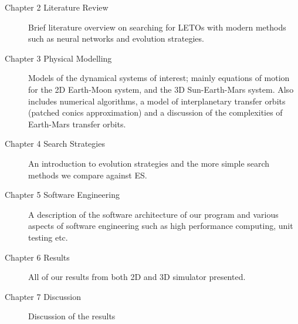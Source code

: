 \begin{description}
	\item[Chapter 2 Literature Review]{Brief literature overview on searching for LETOs with modern methods such as neural networks and evolution strategies.}
	\item[Chapter 3 Physical Modelling]{Models of the dynamical systems of interest; mainly equations of motion for the 2D Earth-Moon system, and the 3D Sun-Earth-Mars system. Also includes numerical algorithms, a model of interplanetary transfer orbits (patched conics approximation) and a discussion of the complexities of Earth-Mars transfer orbits.}
	\item[Chapter 4 Search Strategies]{An introduction to evolution strategies and the more simple search methods we compare against ES.}
	\item[Chapter 5 Software Engineering]{A description of the software architecture of our program and various aspects of software engineering such as high performance computing, unit testing etc.}
	\item[Chapter 6 Results]{All of our results from both 2D and 3D simulator presented.}
	\item[Chapter 7 Discussion]{Discussion of the results}
\end{description}


